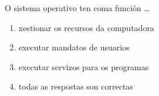 \begin{diapo}\begin{frame}{O sistema operativo ten coma función \dots}
\begin{enumerate}
\item xestionar os recursos da computadora \pause
\item executar mandatos de usuarios \pause
\item executar servizos para os programas\pause
\item todas as respostas son correctas
\end{enumerate} 
\end{frame}
\end{diapo}

